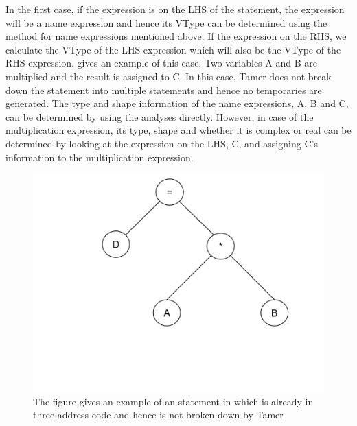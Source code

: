 In the first case, if the expression is on the LHS of the statement, the expression will be a name expression and hence its VType can be determined using the method for name expressions mentioned above. If the expression on the RHS, we calculate the VType of the LHS expression which will also be the VType of the RHS expression.  gives an example of this case. Two variables \textsf{A} and \textsf{B} are multiplied and the result is assigned to \textsf{C}. In this case, Tamer does not break down the statement into multiple statements and hence no temporaries are generated. The type and shape information of the name expressions, \textsf{A}, \textsf{B} and \textsf{C}, can be determined by using the analyses directly. However, in case of the multiplication expression, its type, shape and whether it is complex or real can be determined by looking at the expression on the LHS, \textsf{C}, and assigning \textsf{C}'s information to the multiplication expression. 
\begin{figure}[htbp]
\begin{center}
\includegraphics[scale=0.5]{Figures/no_tac.png}
\caption[Statement in \matlab in three address code]{The figure gives an example of an statement in \matlab which is already in three address code and hence is not broken down by Tamer }
\label{Fig:notac}
\end{center}
\end{figure}

